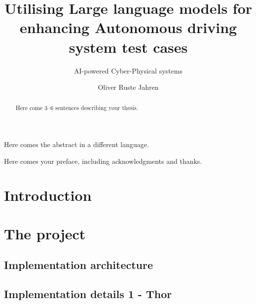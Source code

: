 \documentclass[UKenglish]{uiomasterthesis}  %
\title{Utilising Large language models for enhancing Autonomous driving system test cases }
\subtitle{AI-powered Cyber-Physical systems}         %
\author{Oliver Ruste Jahren}                      %
\begin{document}
\uiomasterfp[dept={Department of Informatics},  %
  program={Informatics: Programming and Systems architecture},                        %
  supervisor={Shaukat Ali \and Karoline Nylænder},                    %
  info={Simula Research Laboratory},
  date={Fall 2025},
  long]                                     %

\frontmatter{}
\begin{abstract}
  Here come 3--6 sentences describing your thesis.
\end{abstract}

\begin{xabstract}[Sammendrag]               %
  Here comes the abstract in a different language.
\end{xabstract}

\tableofcontents{}                          %
\listoffigures{}                            %

\begin{preface}
  Here comes your preface, including acknowledgments and thanks.
\end{preface}

\mainmatter{}
\part{Introduction}





\part{The project}



\chapter{Implementation architecture}
\chapter{Implementation details 1 - Thor}
\end{document}
